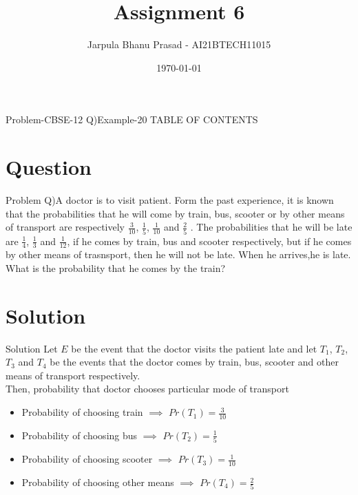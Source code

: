 \documentclass{beamer}
\title{Assignment 6}
\author{Jarpula Bhanu Prasad - AI21BTECH11015}
\date{\today}
\begin{document}
\begin{frame}
    \titlepage 
\end{frame}

\logo{}


\begin{frame}{Problem-CBSE-12 Q)Example-20}
TABLE OF CONTENTS
    \tableofcontents
\end{frame}


\section{Question}
\begin{frame}{Problem}
Q)A doctor is to visit patient. Form the past experience, it is known that the probabilities that he will come by train, bus, scooter or by other means of transport are respectively $\frac{3}{10}$, $\frac{1}{5}$, $\frac{1}{10}$ and $\frac{2}{5}$ . The probabilities that he will be late are $\frac{1}{4}$, $\frac{1}{3}$ and $\frac{1}{12}$, if he comes by train, bus and scooter respectively, but if he comes by other means of trasnsport, then he will not be late. When he arrives,he is late. What is the probability that he comes by the train?
\end{frame}

\section{Solution}
\begin{frame}{Solution}
 Let $E$ be the event that the doctor visits the patient late and let $T_1$, $T_2$, $T_3$ and $T_4$ be the events that the doctor comes by train, bus, scooter and other means of transport respectively. \\
Then, probability that doctor chooses particular mode of transport
\begin{itemize}
    \item Probability of choosing train $\implies$ $Pr(T_1) = \frac{3}{10}$ 
    \item Probability of choosing bus $\implies$ $Pr(T_2) = \frac{1}{5}$
    \item Probability of choosing scooter $\implies$ $Pr(T_3) = \frac{1}{10}$ 
    \item Probability of choosing other means $\implies$ $Pr(T_4) = \frac{2}{5}$
\end{itemize}
\end{frame}
\end{document}
